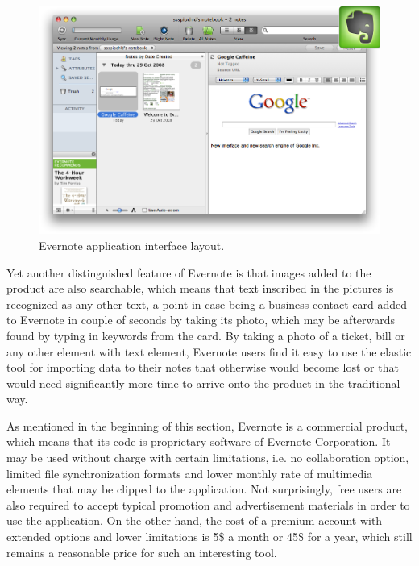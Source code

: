 \begin{figure}[ht]
\begin{center}
\includegraphics[scale=0.38]{img/evernote_demo.png}
\caption{Evernote application interface layout.}
\label{fig:evernote_demo}
\end{center}
\end{figure}
Yet another distinguished feature of Evernote is that images added to the product are also searchable, which means that text inscribed in the pictures is recognized as any other text, a point in case being a business contact card added to Evernote in couple of seconds by taking its photo, which may be afterwards found by typing in keywords from the card. By taking a photo of a ticket, bill or any other element with text element, Evernote users find it easy to use the elastic tool for importing data to their notes that otherwise would become lost or that would need significantly more time to arrive onto the product in the traditional way.

As mentioned in the beginning of this section, Evernote is a commercial product, which means that its code is proprietary software of Evernote Corporation. It may be used without charge with certain limitations, i.e. no collaboration option, limited file synchronization formats and lower monthly rate of multimedia elements that may be clipped to the application. Not surprisingly, free users are also required to accept typical promotion and advertisement materials in order to use the application. On the other hand, the cost of a premium account with extended options and lower limitations is 5\$ a month or 45\$ for a year, which still remains a reasonable price for such an interesting tool. 

